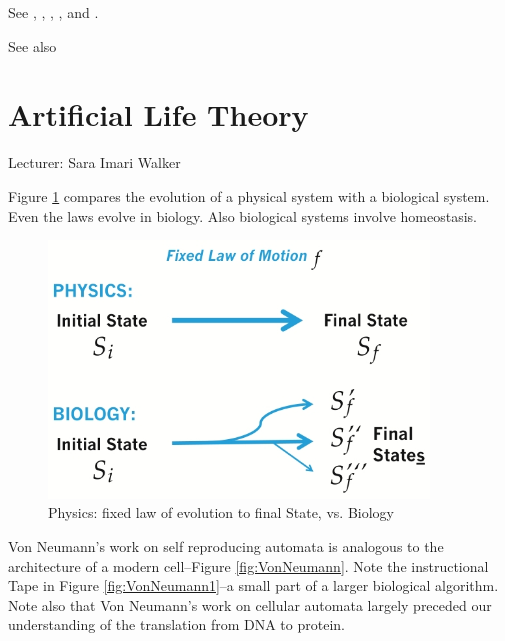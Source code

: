 \documentclass[]{article}
\begin{document}
See \cite{eigen1978hypercycle}, \cite{eigen1988molecular}, \cite{eigen2002error}, \cite{crotty2001rna}, and \cite{stadtler2002fitness_landscapes}.

See also \cite{wessner2010origins}


\section{Artificial Life Theory}

Lecturer: Sara Imari Walker

Figure \ref{fig:PhysicsvsBiology} compares the evolution of a physical system with a biological system. Even the laws evolve in biology. Also biological systems involve homeostasis.
\begin{figure}[H]
	\caption{Physics: fixed law of evolution to final State, vs. Biology}\label{fig:PhysicsvsBiology}
	\includegraphics[width=0.9\textwidth]{PhysicsvsBiology}
\end{figure}

Von Neumann's work on self reproducing automata \cite{neumann1966theory}  \cite{neumann1958computer} is analogous to  the architecture of a modern cell--Figure \ref{fig:VonNeumann}. Note the instructional Tape in Figure  \ref{fig:VonNeumann1}--a small part of a larger biological algorithm. Note also that Von Neumann's work on cellular automata largely preceded our understanding of the translation from DNA to protein.
\end{document}

